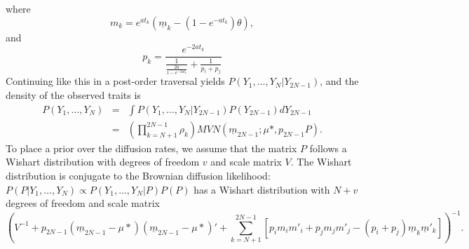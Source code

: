 \documentclass[12pt]{article}
\begin{document}
where
\begin{equation}
m_k = e^{at_k} ( \underline{m}_k - (1 - e^{-at_k}) \theta ), 
\end{equation}
and 
\begin{equation}
p_k = \frac{e^{-2at_k}}{  \frac{1}{\frac{2a}{1-e^{-2at_k}}}  + \frac{1}{p_i + p_j} } 
\end{equation}
Continuing like this in a post-order traversal yields $P(Y_1,\dots,Y_N | Y_{2N-1})$, and the density of
the observed traits is
\begin{eqnarray}
P(Y_1,\dots,Y_N) & = & \int P(Y_1,\dots,Y_N | Y_{2N-1}) P(Y_{2N-1}) dY_{2N-1} \\
& = & \left( \prod_{k=N+1}^{2N-1} \rho_k \right) MVN(\underline{m}_{2N-1};\mu*, p_{2N-1} P) .
\end{eqnarray}
To place a prior over the diffusion rates, we assume that the matrix $P$ follows a Wishart distribution with degrees
of freedom $v$ and scale matrix $V$.  The Wishart distribution is conjugate to the Brownian diffusion likelihood: 
$P(P | Y_1,\dots,Y_N) \propto  P(Y_1,\dots,Y_N |P) P(P)$ has a Wishart distribution with $N+v$ degrees of freedom and scale matrix
\begin{equation*}
\left( V^{-1} + p_{2N-1}(\underline{m}_{2N-1} - \mu*)(\underline{m}_{2N-1} - \mu*)'  
+ \sum_{k=N+1}^{2N-1} [ p_i m_i m'_i + p_j m_j m'_j - (p_i + p_j)\underline{m}_k \underline{m}'_k]  \right)^{-1} . 
\end{equation*}










\end{document}
